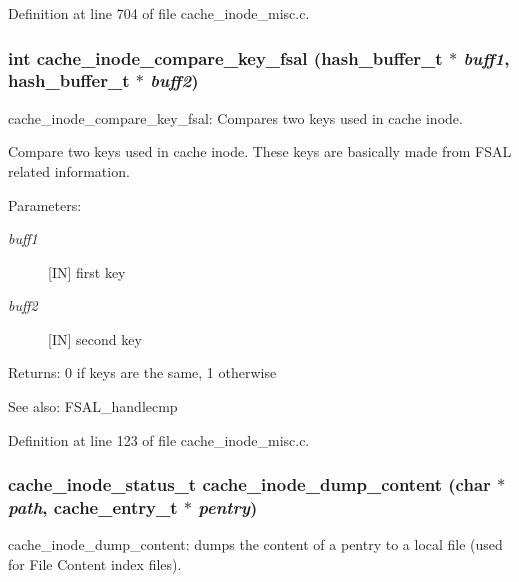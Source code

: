 Definition at line 704 of file cache\_\-inode\_\-misc.c.
\subsubsection{\setlength{\rightskip}{0pt plus 5cm}int cache\_\-inode\_\-compare\_\-key\_\-fsal (hash\_\-buffer\_\-t $\ast$ {\em buff1}, hash\_\-buffer\_\-t $\ast$ {\em buff2})}\label{cache__inode__misc_8c_a0}


cache\_\-inode\_\-compare\_\-key\_\-fsal: Compares two keys used in cache inode.

Compare two keys used in cache inode. These keys are basically made from FSAL related information.

\begin{Desc}
\item[Parameters:]
\begin{description}
\item[{\em buff1}][IN] first key \item[{\em buff2}][IN] second key \end{description}
\end{Desc}
\begin{Desc}
\item[Returns:]0 if keys are the same, 1 otherwise\end{Desc}
\begin{Desc}
\item[See also:]FSAL\_\-handlecmp \end{Desc}


Definition at line 123 of file cache\_\-inode\_\-misc.c.
\subsubsection{\setlength{\rightskip}{0pt plus 5cm}cache\_\-inode\_\-status\_\-t cache\_\-inode\_\-dump\_\-content (char $\ast$ {\em path}, cache\_\-entry\_\-t $\ast$ {\em pentry})}\label{cache__inode__misc_8c_a16}


cache\_\-inode\_\-dump\_\-content: dumps the content of a pentry to a local file (used for File Content index files).

